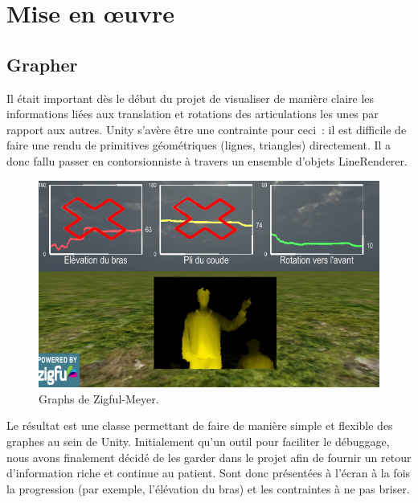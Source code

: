 \section{Mise en œuvre}

\subsection{Grapher}
Il était important dès le début du projet de visualiser de manière claire les 
informations liées aux translation et rotations des articulations les unes par 
rapport aux autres. Unity s'avère être une contrainte pour ceci~: il est difficile
de faire une rendu de primitives géométriques (lignes, triangles) directement. Il
a donc fallu passer en contorsionniste à travers un ensemble d'objets LineRenderer.

\begin{figure}[h!]
\centering
\includegraphics[width=\linewidth]{../images/zfm_graph}
\caption{Graphs de Zigful-Meyer.}
\end{figure}

Le résultat est une classe permettant de faire de manière simple et flexible des
graphes au sein de Unity. Initialement qu'un outil pour faciliter le 
débuggage, nous avons finalement décidé de les garder dans le projet afin de
fournir un retour d'information riche et continue au patient. Sont donc présentées 
à l'écran à la fois la progression (par exemple, l'élévation du bras) et les 
contraintes à ne pas briser.
    
